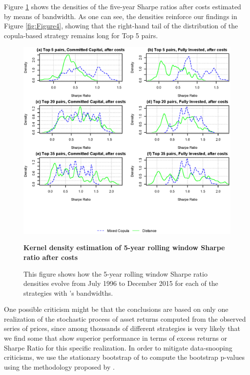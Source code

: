 \vspace{0.6cm}

Figure \ref{fig:Figure5} shows the densities of the five-year Sharpe ratios after costs estimated by means of \citet*{sj1991} bandwidth. As one can see, the densities reinforce our findings in Figure \ref{fig:Figure4}, showing that the right-hand tail of the distribution of the copula-based strategy remains long for Top 5 pairs.


\begin{figure}[!ht]
	\centering
	\includegraphics[width=\linewidth]{Figure5.eps}
	\captionsetup{justification=raggedright,
		singlelinecheck=false
	}
	\caption{\textbf{Kernel density estimation of 5-year rolling window Sharpe ratio after costs}}
	\caption*{\scriptsize  This figure shows how the 5-year rolling window Sharpe ratio densities evolve from July 1996 to December 2015 for each of the strategies with \citet*{sj1991}'s bandwidths.}
	\label{fig:Figure5}
\end{figure}

One possible criticism might be that the conclusions are based on only one realization of the stochastic process of asset returns computed from the observed series of prices, since among thousands of different strategies is very likely that we find some that show superior performance in terms of excess returns or Sharpe Ratio for this specific realization. In order to mitigate data-snooping criticisms, we use the stationary bootstrap of \citet*{pr94} to compute the bootstrap p-values using the methodology proposed by \citet*{lw08}. 

